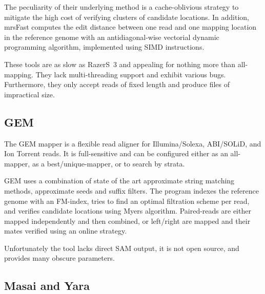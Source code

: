 The peculiarity of their underlying method is a cache-oblivious strategy to mitigate the high cost of verifying clusters of candidate locations.
In addition, mrsFast computes the edit distance between one read and one mapping location in the reference genome with an antidiagonal-wise vectorial dynamic programming algorithm, implemented using SIMD instructions.

These tools are as slow as RazerS~3 and appealing for nothing more than all-mapping.
They lack multi-threading support and exhibit various bugs.
Furthermore, they only accept reads of fixed length and produce files of impractical size.


\subsection{GEM}

The GEM mapper \citep{Gem} is a flexible read aligner for Illumina/Solexa, ABI/SOLiD, and Ion Torrent reads.
It is full-sensitive and can be configured either as an all-mapper, as a best/unique-mapper, or to search by strata.

GEM uses a combination of state of the art approximate string matching methods, \eg approximate seeds and suffix filters.
The program indexes the reference genome with an FM-index, tries to find an optimal filtration scheme per read, and verifies candidate locations using Myers algorithm.
Paired-reads are either mapped independently and then combined, or left/right are mapped and their mates verified using an online strategy.

Unfortunately the tool lacks direct SAM output, it is not open source, and provides many obscure parameters.


\subsection{Masai and Yara}


\begin{landscape}
\begin{table}[h]
  \center
  \sffamily
	\renewcommand{\tabcolsep}{0.8ex}
	
\end{table}
\end{landscape}

